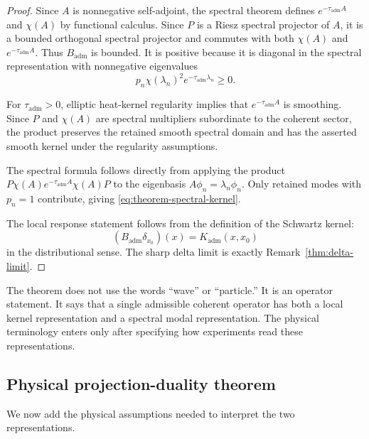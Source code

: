 \documentclass[11pt]{article}
\newcommand{\Kadm}{K_{\mathrm{adm}}}
\newcommand{\Badm}{B_{\mathrm{adm}}}
\newcommand{\ta}{\tau_{\mathrm{adm}}}
\begin{document}
\begin{proof}
Since \(A\) is nonnegative self-adjoint, the spectral theorem defines \(e^{-\ta A}\) and
\(\chi(A)\) by functional calculus. Since \(P\) is a Riesz spectral projector of \(A\), it is a
bounded orthogonal spectral projector and commutes with both \(\chi(A)\) and \(e^{-\ta A}\).
Thus \(\Badm\) is bounded. It is positive because it is diagonal in the spectral representation
with nonnegative eigenvalues
\begin{equation}
  p_n\chi(\lambda_n)^2e^{-\ta\lambda_n}\ge0.
\end{equation}

For \(\ta>0\), elliptic heat-kernel regularity implies that \(e^{-\ta A}\) is smoothing. Since
\(P\) and \(\chi(A)\) are spectral multipliers subordinate to the coherent sector, the product
preserves the retained smooth spectral domain and has the asserted smooth kernel under the
regularity assumptions.

The spectral formula follows directly from applying the product
\(P\chi(A)e^{-\ta A}\chi(A)P\) to the eigenbasis \(A\phi_n=\lambda_n\phi_n\). Only retained
modes with \(p_n=1\) contribute, giving \eqref{eq:theorem-spectral-kernel}.

The local response statement follows from the definition of the Schwartz kernel:
\begin{equation}
  (\Badm\delta_{x_0})(x)=\Kadm(x,x_0)
\end{equation}
in the distributional sense. The sharp delta limit is exactly Remark~\ref{thm:delta-limit}.
\end{proof}

\begin{remark}
\label{rem:not-merely-interpretive}
The theorem does not use the words ``wave'' or ``particle.'' It is an operator statement.
It says that a single admissible coherent operator has both a local kernel representation and
a spectral modal representation. The physical terminology enters only after specifying how
experiments read these representations.
\end{remark}

\subsection{Physical projection-duality theorem}
\label{subsec:physical-projection-duality-theorem}

We now add the physical assumptions needed to interpret the two representations.
\end{document}
